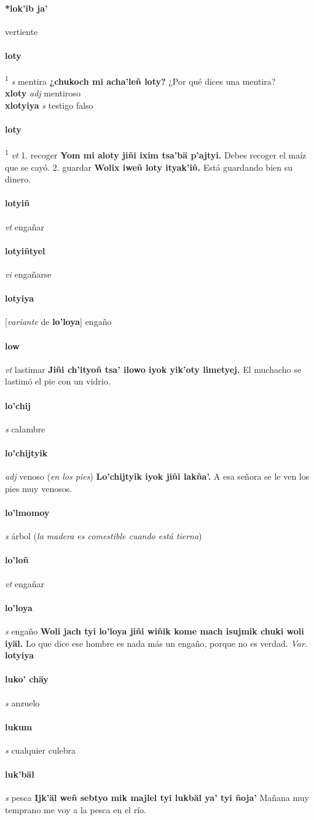 \documentclass{scrbook}
\newcommand{\entry}[1]{\paragraph{#1}}
\newcommand{\onedefinition}[1]{#1.}
\newcommand{\defsuperscript}[1]{\textsuperscript{1}}
\newcommand{\partofspeech}[1]{\textit{#1}}
\newcommand{\spanishtranslation}[1]{#1}
\newcommand{\clarification}[1]{(\textit{#1})}
\newcommand{\cholexample}[1]{\textbf{#1}}
\newcommand{\exampletranslation}[1]{#1}
\newcommand{\secondaryentry}[1]{\\\textbf{#1}}
\newcommand{\secondpartofspeech}[1]{\textit{#1}}
\newcommand{\secondtranslation}[1]{#1}
\newcommand{\variation}[1]{\textit{Var.} \textbf{#1}}
\newcommand{\conjugationtense}[1]{[\textit{#1}}
\newcommand{\conjugationverb}[1]{de \textbf{#1}]}
\begin{document}
\begin{multicols}{2}
\entry{*lok'ib ja'}
\spanishtranslation{vertiente}

\entry{loty}
\defsuperscript{1}
\partofspeech{s}
\spanishtranslation{mentira}
\cholexample{¿chukoch mi acha'leñ loty?}
\exampletranslation{¿Por qué dices una mentira?}
\secondaryentry{xloty}
\secondpartofspeech{adj}
\secondtranslation{mentiroso}
\secondaryentry{xlotyiya}
\secondpartofspeech{s}
\secondtranslation{testigo falso}

\entry{loty}
\defsuperscript{2}
\partofspeech{vt}
\onedefinition{1}
\spanishtranslation{recoger}
\cholexample{Yom mi aloty jiñi ixim tsa'bä p'ajtyi.}
\exampletranslation{Debes recoger el maíz que se cayó.}
\onedefinition{2}
\spanishtranslation{guardar}
\cholexample{Wolix iweñ loty ityak'iñ.}
\exampletranslation{Está guardando bien su dinero.}

\entry{lotyiñ}
\partofspeech{vt}
\spanishtranslation{engañar}

\entry{lotyiñtyel}
\partofspeech{vi}
\spanishtranslation{engañarse}

\entry{lotyiya}
\conjugationtense{variante}
\conjugationverb{lo'loya}
\spanishtranslation{engaño}

\entry{low}
\partofspeech{vt}
\spanishtranslation{lastimar}
\cholexample{Jiñi ch'ityoñ tsa' ilowo iyok yik'oty limetyej.}
\exampletranslation{El muchacho se lastimó el pie con un vidrio.}

\entry{lo'chij}
\partofspeech{s}
\spanishtranslation{calambre}

\entry{lo'chijtyik}
\partofspeech{adj}
\spanishtranslation{venoso}
\clarification{en los pies}
\cholexample{Lo'chijtyik iyok jiñi lakña'.}
\exampletranslation{A esa señora se le ven los pies muy venosos.}

\entry{lo'lmomoy}
\partofspeech{s}
\spanishtranslation{árbol}
\clarification{la madera es comestible cuando está tierna}

\entry{lo'loñ}
\partofspeech{vt}
\spanishtranslation{engañar}

\entry{lo'loya}
\partofspeech{s}
\spanishtranslation{engaño}
\cholexample{Woli jach tyi lo'loya jiñi wiñik kome mach isujmik chuki woli iyäl.}
\exampletranslation{Lo que dice ese hombre es nada más un engaño, porque no es verdad.}
\variation{lotyiya}

\entry{luko' chäy}
\partofspeech{s}
\spanishtranslation{anzuelo}

\entry{lukum}
\partofspeech{s}
\spanishtranslation{cualquier culebra}

\entry{luk'bäl}
\partofspeech{s}
\spanishtranslation{pesca}
\cholexample{Ijk'äl weñ sebtyo mik majlel tyi lukbäl ya' tyi ñoja'}
\exampletranslation{Mañana muy temprano me voy a la pesca en el río.}


\end{multicols}
\end{document}
